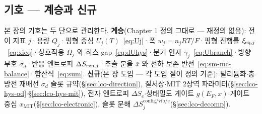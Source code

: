\subsection*{기호 --- 계승과 신규}
본 장의 기호는 두 단으로 관리한다. \textbf{계승}(Chapter 1 정의 그대로 --- 재정의 없음):
전이 지표 $j$·용량 $Q_j$·평형 중심 $U_j(T)$~\eqref{eq:Uj}·폭 $w_j=n_jRT/F$·평형 진행률
$\xi_{\mathrm{eq},j}$~\eqref{eq:xieq}·상호작용 $\Omega_j$ 와 히스 gap~\eqref{eq:dUhys}·분기 인자
$\gamma_j$~\eqref{eq:Ubranch}·방향 부호 $\sigma_d$·반응 엔트로피 $\Delta S_{\mathrm{rxn},j}$·추출 분율
$\bar x$ 와 전하 보존 반전~\eqref{eq:sm-mc-balance}·합산식~\eqref{eq:sum}. \textbf{신규}(본 장
도입 --- 각 도입 절이 정의 기준): 탈리튬화$\cdot$충방전 재배선 $\sigma_d$ 슬롯 규약(\S\ref{sec:lco-direction}),
질서상$\cdot$MIT 2상역 파라미터(\S\ref{sec:lco-hys-od}$\cdot$\S\ref{sec:lco-hys-mit}), 전자 엔트로피 $\Delta S_e$$\cdot$상태밀도
게이트 $g(E_F,x)$$\cdot$게이트 중심 $x_\mathrm{MIT}$(\S\ref{sec:lco-electronic}), 슬롯 분해
$\Delta S^\mathrm{config/vib/e}_j$(\S\ref{sec:lco-decomp}).
